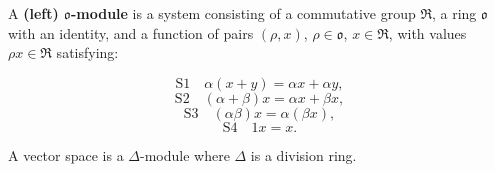 A \textbf{(left) $\mathfrak{o}$-module} is a system consisting of a commutative group $\mathfrak{R}$, a ring $\mathfrak{o}$ with an identity, and a function of pairs $(\rho, x)$, $\rho \in \mathfrak{o}$, $x \in \mathfrak{R}$, with values $\rho x \in \mathfrak{R}$ satisfying:

$$
\text{S}1 \quad \alpha(x + y) = \alpha x + \alpha y,
$$
$$
\text{S}2 \quad (\alpha + \beta)x = \alpha x + \beta x,
$$
$$
\text{S}3 \quad (\alpha\beta)x = \alpha(\beta x),
$$
$$
\text{S}4 \quad 1x = x.
$$

A vector space is a $\Delta$-module where $\Delta$ is a division ring.
